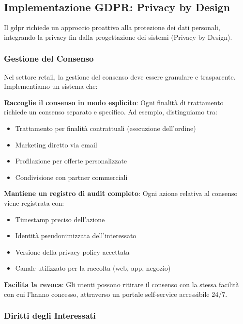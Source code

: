 \subsection{\texorpdfstring{Implementazione GDPR: Privacy by Design}{4.4.2 - Implementazione GDPR: Privacy by Design}}
\label{subsec:4.4.2_gdpr}

Il \gls{gdpr} richiede un approccio proattivo alla protezione dei dati personali, integrando la privacy fin dalla progettazione dei sistemi (Privacy by Design).

\subsubsection{\texorpdfstring{Gestione del Consenso}{4.4.2.1 - Gestione del Consenso}}

Nel settore retail, la gestione del consenso deve essere granulare e trasparente. Implementiamo un sistema che:

\textbf{Raccoglie il consenso in modo esplicito}: Ogni finalità di trattamento richiede un consenso separato e specifico. Ad esempio, distinguiamo tra:
\begin{itemize}
    \item Trattamento per finalità contrattuali (esecuzione dell'ordine)
    \item Marketing diretto via email
    \item Profilazione per offerte personalizzate
    \item Condivisione con partner commerciali
\end{itemize}

\textbf{Mantiene un registro di audit completo}: Ogni azione relativa al consenso viene registrata con:
\begin{itemize}
    \item Timestamp preciso dell'azione
    \item Identità pseudonimizzata dell'interessato
    \item Versione della privacy policy accettata
    \item Canale utilizzato per la raccolta (web, app, negozio)
\end{itemize}

\textbf{Facilita la revoca}: Gli utenti possono ritirare il consenso con la stessa facilità con cui l'hanno concesso, attraverso un portale self-service accessibile 24/7.

\subsubsection{\texorpdfstring{Diritti degli Interessati}{4.4.2.2 - Diritti degli Interessati}}

